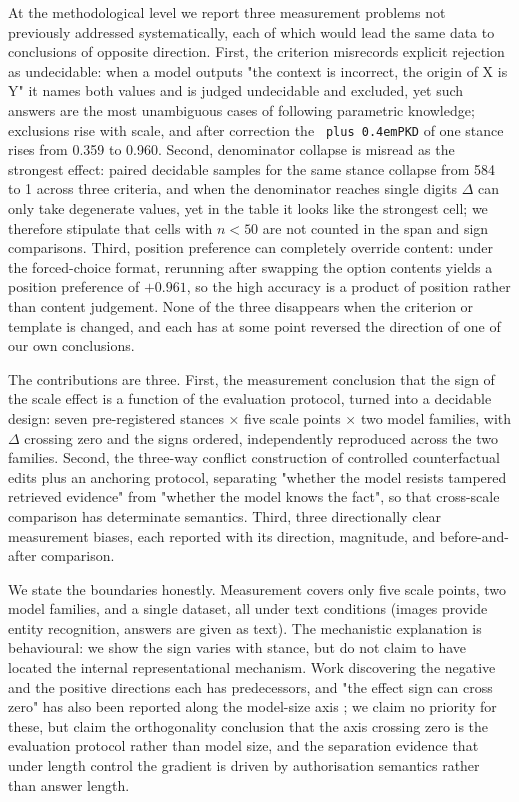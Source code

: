 \documentclass[pdflatex,sn-basic,Numbered]{sn-jnl}
\theoremstyle{thmstyleone}
\theoremstyle{thmstyletwo}
\theoremstyle{thmstylethree}
\DeclareRobustCommand{\code}[1]{\texttt{\spaceskip=0pt plus 0.4em\relax#1}}
\begin{document}
At the methodological level we report three measurement problems not previously addressed systematically, each of which would lead the same data to conclusions of opposite direction. First, the criterion misrecords explicit rejection as undecidable: when a model outputs "the context is incorrect, the origin of X is Y" it names both values and is judged undecidable and excluded, yet such answers are the most unambiguous cases of following parametric knowledge; exclusions rise with scale, and after correction the \code{PKD} of one stance rises from 0.359 to 0.960. Second, denominator collapse is misread as the strongest effect: paired decidable samples for the same stance collapse from 584 to 1 across three criteria, and when the denominator reaches single digits $\Delta$ can only take degenerate values, yet in the table it looks like the strongest cell; we therefore stipulate that cells with $n<50$ are not counted in the span and sign comparisons. Third, position preference can completely override content: under the forced-choice format, rerunning after swapping the option contents yields a position preference of $+0.961$, so the high accuracy is a product of position rather than content judgement. None of the three disappears when the criterion or template is changed, and each has at some point reversed the direction of one of our own conclusions.

The contributions are three. First, the measurement conclusion that the sign of the scale effect is a function of the evaluation protocol, turned into a decidable design: seven pre-registered stances × five scale points × two model families, with $\Delta$ crossing zero and the signs ordered, independently reproduced across the two families. Second, the three-way conflict construction of controlled counterfactual edits plus an anchoring protocol, separating "whether the model resists tampered retrieved evidence" from "whether the model knows the fact", so that cross-scale comparison has determinate semantics. Third, three directionally clear measurement biases, each reported with its direction, magnitude, and before-and-after comparison.

We state the boundaries honestly. Measurement covers only five scale points, two model families, and a single dataset, all under text conditions (images provide entity recognition, answers are given as text). The mechanistic explanation is behavioural: we show the sign varies with stance, but do not claim to have located the internal representational mechanism. Work discovering the negative and the positive directions each has predecessors, and "the effect sign can cross zero" has also been reported along the model-size axis \cite{ref7}; we claim no priority for these, but claim the orthogonality conclusion that the axis crossing zero is the evaluation protocol rather than model size, and the separation evidence that under length control the gradient is driven by authorisation semantics rather than answer length.
\end{document}
